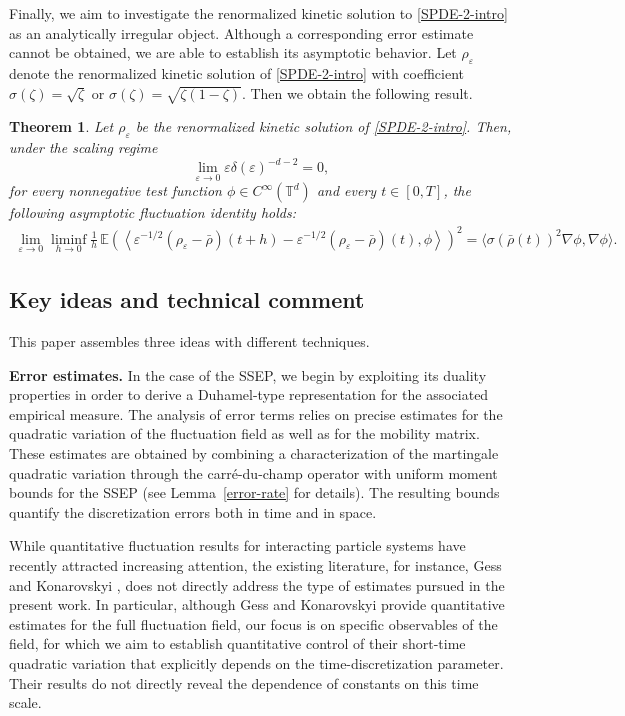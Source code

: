 \documentclass[UTF-8,reqno]{amsart}
\numberwithin{equation}{section}
\newtheorem{theorem}{Theorem}[section]
\begin{document}
Finally, we aim to investigate the renormalized kinetic solution to \eqref{SPDE-2-intro} as an analytically irregular object. Although a corresponding error estimate cannot be obtained, we are able to establish its asymptotic behavior. Let $\rho_{\varepsilon}$ denote the renormalized kinetic solution of \eqref{SPDE-2-intro} with coefficient $\sigma(\zeta)=\sqrt{\zeta}$ or $\sigma(\zeta)=\sqrt{\zeta(1-\zeta)}$. Then we obtain the following result.
\begin{theorem}\label{thm-4-intro}
Let $\rho_{\varepsilon}$ be the renormalized kinetic solution of \eqref{SPDE-2-intro}. Then, under the scaling regime $$\lim_{\varepsilon\rightarrow0}\varepsilon\delta(\varepsilon)^{-d-2}=0,$$ for every nonnegative test function $\phi \in C^{\infty}(\mathbb{T}^d)$ and every $t \in [0,T]$, the following asymptotic fluctuation identity holds:
\begin{align*}
	\lim_{\varepsilon \to 0} \liminf_{h \to 0} \frac{1}{h} \, \mathbb{E} \left( \left\langle \varepsilon^{-1/2}(\rho_{\varepsilon} - \bar{\rho})(t + h) - \varepsilon^{-1/2}(\rho_{\varepsilon} - \bar{\rho})(t), \phi \right\rangle \right)^2 = \langle \sigma(\bar{\rho}(t))^2 \nabla \phi, \nabla \phi \rangle.
\end{align*}
\end{theorem}

\subsection{Key ideas and technical comment}
This paper assembles three ideas with different techniques. 

\textbf{Error estimates. }In the case of the SSEP, we begin by exploiting its duality properties in order to derive a Duhamel-type representation for the associated empirical measure. The analysis of error terms relies on precise estimates for the quadratic variation of the fluctuation field as well as for the mobility matrix. These estimates are obtained by combining a characterization of the martingale quadratic variation through the carr\'e-du-champ operator with uniform moment bounds for the SSEP (see Lemma~\ref{error-rate} for details). The resulting bounds quantify the discretization errors both in time and in space. 

While quantitative fluctuation results for interacting particle systems have recently attracted increasing attention, the existing literature, for instance, Gess and Konarovskyi \cite{GK24}, does not directly address the type of estimates pursued in the present work. In particular, although Gess and Konarovskyi provide quantitative estimates for the full fluctuation field, our focus is on specific observables of the field, for which we aim to establish quantitative control of their short-time quadratic variation that explicitly depends on the time-discretization parameter. Their results do not directly reveal the dependence of constants on this time scale. 
\end{document}
